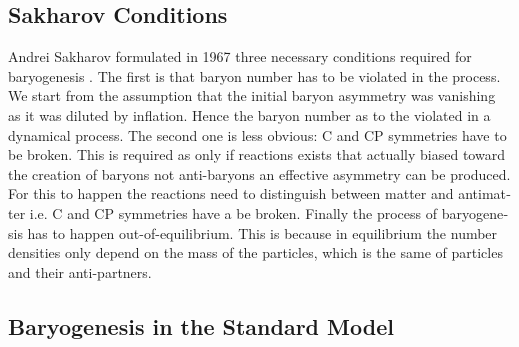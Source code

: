 \documentclass[master,       %
               twoside,        %
               BCOR10mm,       %
               english,ngerman, %
               ]{GAUBM}
\begin{document}
\begin{otherlanguage}{english}
\subsection{Sakharov Conditions}
Andrei Sakharov formulated in 1967 three necessary conditions required for baryogenesis \cite{Sakharov_1991}.
The first is that baryon number has to be violated in the process. We start from the assumption that the initial baryon asymmetry was vanishing as it was diluted by inflation.
Hence the baryon number as to the violated in a dynamical process.
The second one is less obvious: C and CP symmetries have to be broken.
This is required as only if
reactions exists that actually biased toward the creation of baryons not anti-baryons an effective asymmetry can be produced.
For this to happen the reactions need to distinguish between matter and antimatter i.e. C and CP symmetries have a be broken.
Finally the process of baryogenesis has to happen out-of-equilibrium. This is because
in equilibrium the number densities only depend on the mass of the particles, which is the same of particles and their anti-partners.


\subsection{Baryogenesis in the Standard Model}
\label{sec:baryogenesis_in_the_standard_model}


\end{otherlanguage}
\end{document}
